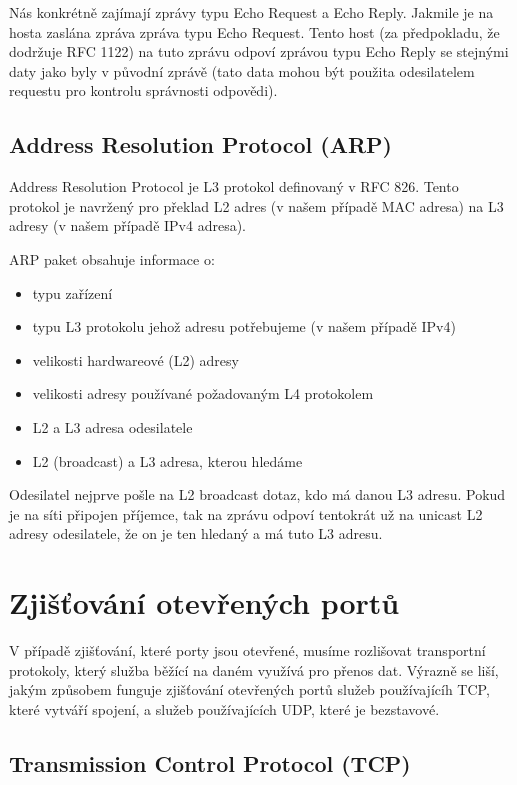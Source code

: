 \documentclass[../projekt.tex]{subfiles}
\begin{document}
Nás konkrétně zajímají zprávy typu Echo Request a Echo Reply. Jakmile je na hosta zaslána zpráva zpráva typu Echo Request. Tento host (za předpokladu, že dodržuje RFC 1122\cite{RFC1122}) na tuto zprávu odpoví zprávou typu Echo Reply se stejnými daty jako byly v původní zprávě (tato data mohou být použita odesilatelem requestu pro kontrolu správnosti odpovědi).

\subsection{Address Resolution Protocol (ARP)} \label{arp}
Address Resolution Protocol je L3 protokol definovaný v RFC 826\cite{RFC0826}. Tento protokol je navržený pro překlad L2 adres (v našem případě MAC adresa) na L3 adresy (v našem případě IPv4 adresa).

ARP paket obsahuje informace o:
\begin{itemize}
    \item typu zařízení
    \item typu L3 protokolu jehož adresu potřebujeme (v našem případě IPv4)
    \item velikosti hardwareové (L2) adresy
    \item velikosti adresy používané požadovaným L4 protokolem
    \item L2 a L3 adresa odesilatele
    \item L2 (broadcast) a L3 adresa, kterou hledáme
\end{itemize}

Odesilatel nejprve pošle na L2 broadcast dotaz, kdo má danou L3 adresu. Pokud je na síti připojen příjemce, tak na zprávu odpoví tentokrát už na unicast L2 adresy odesilatele, že on je ten hledaný a má tuto L3 adresu.

\section{Zjišťování otevřených portů}

V případě zjišťování, které porty jsou otevřené, musíme rozlišovat transportní protokoly, který služba běžící na daném využívá pro přenos dat. Výrazně se liší, jakým způsobem funguje zjišťování otevřených portů služeb používajícíh TCP, které vytváří spojení, a služeb používajících UDP, které je bezstavové.

\subsection{Transmission Control Protocol (TCP)} \label{tcp}
\end{document}
